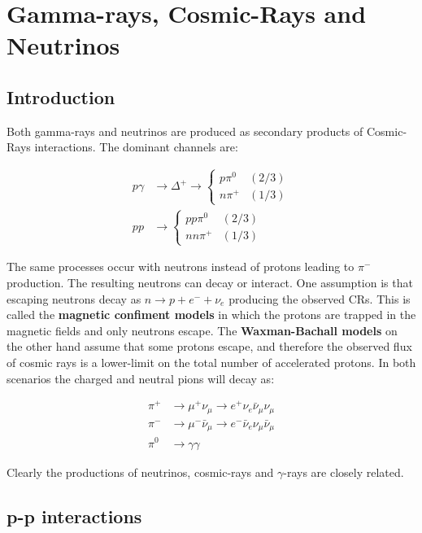 \documentclass[
  letterpaper,
  DIV=11,
  numbers=noendperiod]{scrreprt}
\begin{document}
\section{Gamma-rays, Cosmic-Rays and
Neutrinos}\label{gamma-rays-cosmic-rays-and-neutrinos}

\subsection{Introduction}\label{introduction-2}

Both gamma-rays and neutrinos are produced as secondary products of
Cosmic-Rays interactions. The dominant channels are:

\[
\begin{aligned}
p\gamma &\rightarrow \Delta^+ \rightarrow \begin{cases}
  p \pi^0 & (2/3)\\
  n \pi^+ & (1/3)
  \end{cases}\\
pp &\rightarrow \begin{cases}
  pp \pi^0 & (2/3)\\
  nn \pi^+ & (1/3)
  \end{cases}
  \end{aligned}\]

The same processes occur with neutrons instead of protons leading to
\(\pi^-\) production. The resulting neutrons can decay or interact. One
assumption is that escaping neutrons decay as
\(n \rightarrow p + e^- + \nu_e\) producing the observed CRs. This is
called the \textbf{magnetic confiment models} in which the protons are
trapped in the magnetic fields and only neutrons escape. The
\textbf{Waxman-Bachall models} on the other hand assume that some
protons escape, and therefore the observed flux of cosmic rays is a
lower-limit on the total number of accelerated protons. In both
scenarios the charged and neutral pions will decay as:

\[\begin{aligned}
\pi^+ &\rightarrow \mu^+ \nu_\mu \rightarrow e^+ \nu_e \bar{\nu}_\mu \nu_\mu\\
\pi^- &\rightarrow \mu^- \bar{\nu}_\mu \rightarrow e^- \bar{\nu}_e \nu_\mu\bar{\nu}_\mu \\
\pi^0 &\rightarrow \gamma\gamma
\end{aligned}\]

Clearly the productions of neutrinos, cosmic-rays and \(\gamma\)-rays
are closely related.

\subsection{p-p interactions}\label{p-p-interactions}
\end{document}
